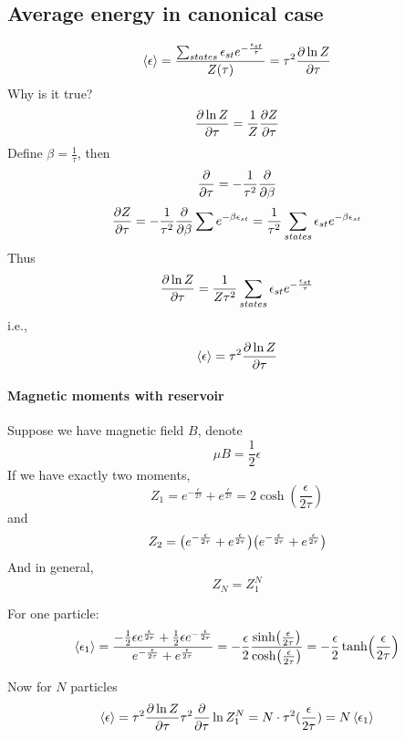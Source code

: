 \subsection{Average energy in canonical case}
$$\expval{\epsilon} = \frac{\sum_{states} \epsilon_{st} e^{-\frac{\epsilon_{st}}{\tau}}}{Z(\tau)} = \tau^2 \pdv{\ln Z}{\tau}$$
Why is it true?
$$\pdv{\ln Z}{\tau} = \frac{1}{Z} \pdv{Z}{\tau} $$
Define $\beta = \frac{1}{\tau}$, then
$$\pdv{\tau} = -\frac{1}{\tau^2} \pdv{\beta}$$
$$\pdv{Z}{\tau} = -\frac{1}{\tau^2} \pdv{\beta} \sum e^{-\beta \epsilon_{st}} = \frac{1}{\tau^2} \sum_{states} \epsilon_{st} e^{-\beta \epsilon_{st}} $$
Thus
$$\pdv{\ln Z}{\tau} = \frac{1}{Z\tau^2} \sum_{states} \epsilon_{st} e^{-\frac{\epsilon_{st}}{\tau} }  $$
i.e.,
$$\expval{\epsilon} = \tau^2 \pdv{\ln Z}{\tau}$$
\paragraph{Magnetic moments with reservoir}
Suppose we have magnetic field $B$, denote
$$\mu B = \frac{1}{2} \epsilon$$
If we have exactly two moments,
$$Z_1 = e^{-\frac{\epsilon}{2\tau}}+e^{\frac{\epsilon}{2\tau}} = 2\cosh(\frac{\epsilon}{2\tau})$$
and
$$Z_2 = \qty( e^{-\frac{\epsilon}{2\tau}}+e^{\frac{\epsilon}{2\tau}} )\qty( e^{-\frac{\epsilon}{2\tau}}+e^{\frac{\epsilon}{2\tau}} ) $$
And in general,
$$Z_N = Z_1^N$$

For one particle:
\begin{align*}
\expval{\epsilon_1} = \frac{-\frac{1}{2} \epsilon e^{\frac{\epsilon}{2\tau}}+\frac{1}{2} \epsilon e^{-\frac{\epsilon}{2\tau}}}{ e^{-\frac{\epsilon}{2\tau}}+e^{\frac{\epsilon}{2\tau}}} = -\frac{\epsilon}{2} \frac{\sinh(\frac{\epsilon}{2\tau})}{\cosh(\frac{\epsilon}{2\tau})} = -\frac{\epsilon}{2}\tanh(\frac{\epsilon}{2\tau})
\end{align*}

Now for $N$ particles
$$\expval{\epsilon} = \tau^2 \pdv{\ln Z}{\tau} \tau^2 \pdv{\tau} \ln Z_1^N = N \cdot \tau^2 (\frac{\epsilon}{2\tau}) = N \expval{\epsilon_1}$$
